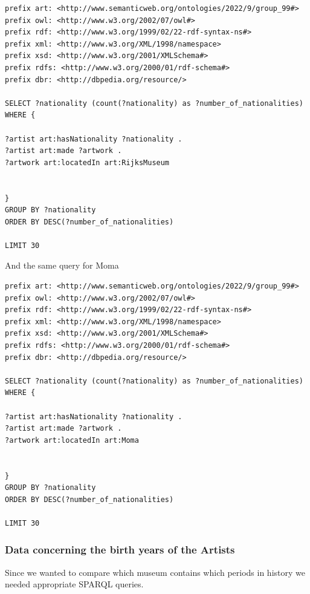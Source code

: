 \documentclass{article}
\begin{document}
\begin{verbatim}
prefix art: <http://www.semanticweb.org/ontologies/2022/9/group_99#>
prefix owl: <http://www.w3.org/2002/07/owl#> 
prefix rdf: <http://www.w3.org/1999/02/22-rdf-syntax-ns#> 
prefix xml: <http://www.w3.org/XML/1998/namespace> 
prefix xsd: <http://www.w3.org/2001/XMLSchema#> 
prefix rdfs: <http://www.w3.org/2000/01/rdf-schema#> 
prefix dbr: <http://dbpedia.org/resource/>

SELECT ?nationality (count(?nationality) as ?number_of_nationalities) WHERE { 

?artist art:hasNationality ?nationality .
?artist art:made ?artwork .
?artwork art:locatedIn art:RijksMuseum


}
GROUP BY ?nationality 
ORDER BY DESC(?number_of_nationalities)

LIMIT 30
\end{verbatim}
\newline
And the same query for Moma
\begin{verbatim}
prefix art: <http://www.semanticweb.org/ontologies/2022/9/group_99#>
prefix owl: <http://www.w3.org/2002/07/owl#> 
prefix rdf: <http://www.w3.org/1999/02/22-rdf-syntax-ns#> 
prefix xml: <http://www.w3.org/XML/1998/namespace> 
prefix xsd: <http://www.w3.org/2001/XMLSchema#> 
prefix rdfs: <http://www.w3.org/2000/01/rdf-schema#> 
prefix dbr: <http://dbpedia.org/resource/>

SELECT ?nationality (count(?nationality) as ?number_of_nationalities) WHERE { 

?artist art:hasNationality ?nationality .
?artist art:made ?artwork .
?artwork art:locatedIn art:Moma


}
GROUP BY ?nationality 
ORDER BY DESC(?number_of_nationalities)

LIMIT 30
\end{verbatim}
\subsubsection{Data concerning the birth years of the Artists}

Since we wanted to compare which museum contains which periods in history we needed appropriate SPARQL queries.
\end{document}
